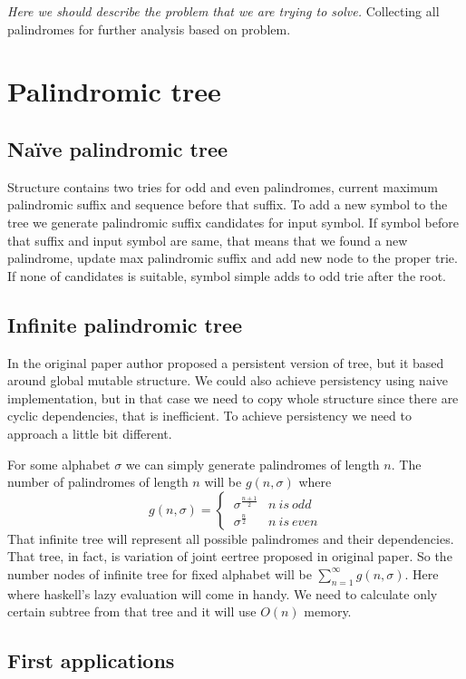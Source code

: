\emph{Here we should describe the problem that we are trying to solve.}
Collecting all palindromes for further analysis based on problem.

\section{Palindromic tree}

\subsection{Naïve palindromic tree}
 Structure contains two tries for odd and even palindromes, current maximum palindromic suffix and sequence before that suffix. To add a new symbol to the tree we generate palindromic suffix candidates for input symbol. If symbol before that suffix and input symbol are same, that means that we found a new palindrome, update max palindromic suffix and add new node to the proper trie. If none of candidates is suitable, symbol simple adds to odd trie after the root. 

\subsection{Infinite palindromic tree}

In the original paper author proposed a persistent version of tree, but it based around global mutable structure. We could also achieve persistency using naive implementation, but in that case we need to copy whole structure since there are cyclic dependencies, that is inefficient. To achieve persistency we need to approach a little bit different. 

For some alphabet $\sigma$ we can simply generate palindromes of length $n$. The number of palindromes of length $n$ will be $g(n, \sigma)$ where 
$$g(n, \sigma) = \begin{cases}
\ \sigma^{\frac{n+1}{2}}  & n \ is \ odd\\
\ \sigma^{\frac{n}{2}}   & n \ is \ even
\end{cases}$$
 That infinite tree will represent all possible palindromes and their dependencies. That tree, in fact, is variation of joint eertree proposed in original paper. So the number nodes of infinite tree for fixed alphabet will be $\sum_{n=1}^{\infty} g(n, \sigma)$. Here where haskell's lazy evaluation will come in handy. We need to calculate only certain subtree from that tree and it will use $O(n)$ memory. 


\subsection{First applications}

